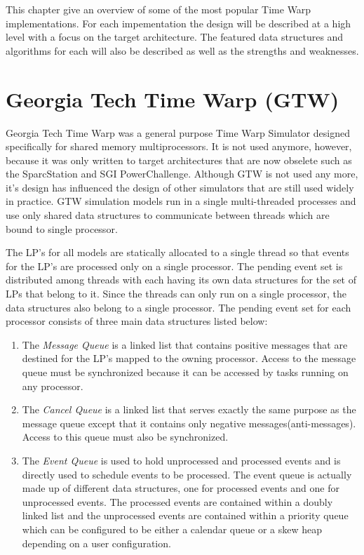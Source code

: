 \documentclass[11pt]{book}
\begin{document}
This chapter give an overview of some of the most popular Time Warp implementations.  For each
impementation the design will be described at a high level with a focus on the target
architecture.  The featured data structures and algorithms for each will also be described
as well as the strengths and weaknesses.

\section{Georgia Tech Time Warp (GTW)}

Georgia Tech Time Warp was a general purpose Time Warp Simulator designed specifically for
shared memory multiprocessors.  It is not used anymore, however, because it was only written
to target architectures that are now obselete such as the SparcStation and SGI PowerChallenge.
Although GTW is not used any more, it's design has influenced the design of other simulators that
are still used widely in practice.  GTW simulation models run in a single multi-threaded processes
and use only shared data structures to communicate between threads which are bound to single processor.

The LP's for all models are statically allocated to a single thread so that events for the
LP's are processed only on a single processor.  The pending event set is distributed among
threads with each having its own data structures for the set of LPs that belong to it.
Since the threads can only run on a single processor, the data structures also belong to a
single processor.  The pending event set for each processor consists of three main data structures
listed below\cite{das-94}:

\begin{enumerate}
    \item The \emph{Message Queue} is a linked list that contains positive messages that
        are destined for the LP's mapped to the owning processor.  Access to the message
        queue must be synchronized because it can be accessed by tasks running on any processor.
    \item The \emph{Cancel Queue} is a linked list that serves exactly the same purpose as
        the message queue except that it contains only negative messages(anti-messages).
        Access to this queue must also be synchronized.
    \item The \emph{Event Queue} is used to hold unprocessed and processed events and is
        directly used to schedule events to be processed.  The event queue is actually made
        up of different data structures, one for processed events and one for unprocessed
        events.  The processed events are contained within a doubly linked list and the
        unprocessed events are contained within a priority queue which can be configured to
        be either a calendar queue or a skew heap depending on a user configuration.
\end{enumerate}
\end{document}
